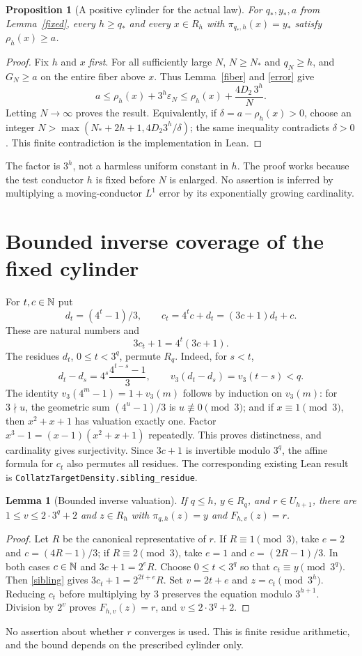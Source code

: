 \documentclass[11pt,a4paper]{article}
\newtheorem{lemma}[theorem]{Lemma}
\newtheorem{proposition}[theorem]{Proposition}
\theoremstyle{definition}\newtheorem{definition}[theorem]{Definition}
\theoremstyle{remark}\newtheorem{remark}[theorem]{Remark}
\newcommand{\proj}[2]{\pi_{#1,#2}}
\newcommand{\code}[1]{{\small\nolinkurl{#1}}}
\begin{document}
\begin{proposition}[A positive cylinder for the actual law]\label{actual}
For $q_*,y_*,a$ from Lemma~\ref{fixed}, every $h\ge q_*$ and every
$x\in R_h$ with $\proj{q_*}h(x)=y_*$ satisfy $\rho_h(x)\ge a$.
\end{proposition}
\begin{proof}
Fix $h$ and $x$ \emph{first}. For all sufficiently large $N$, $N\ge N_*$
and $q_N\ge h$, and $G_N\ge a$ on the entire fiber above $x$. Thus
Lemma~\ref{fiber} and \eqref{error} give
\[
 a\le\rho_h(x)+3^h\varepsilon_N\le\rho_h(x)+\frac{4D_2\,3^h}{N}.
\]
Letting $N\to\infty$ proves the result. Equivalently, if
$\delta=a-\rho_h(x)>0$, choose an integer
$N>\max(N_*+2h+1,4D_2 3^h/\delta)$; the same inequality contradicts
$\delta>0$. This finite contradiction is the implementation in Lean.
\end{proof}
The factor is $3^h$, not a harmless uniform constant in $h$. The proof
works because the test conductor $h$ is fixed before $N$ is enlarged.
No assertion is inferred by multiplying a moving-conductor $L^1$ error
by its exponentially growing cardinality.

\section{Bounded inverse coverage of the fixed cylinder}
For $t,c\in\mathbb N$ put
\[
 d_t=(4^t-1)/3,\qquad c_t=4^tc+d_t=(3c+1)d_t+c.
\]
These are natural numbers and
\begin{equation}\label{sibling}
 3c_t+1=4^t(3c+1).
\end{equation}
The residues $d_t$, $0\le t<3^q$, permute $R_q$. Indeed, for $s<t$,
\[
 d_t-d_s=4^s\frac{4^{t-s}-1}{3},\qquad
 v_3(d_t-d_s)=v_3(t-s)<q.
\]
The identity $v_3(4^m-1)=1+v_3(m)$ follows by induction on $v_3(m)$:
for $3\nmid u$, the geometric sum $(4^u-1)/3$ is $u\not\equiv0\pmod3$;
and if $x\equiv1\pmod3$, then $x^2+x+1$ has valuation exactly one.
Factor $x^3-1=(x-1)(x^2+x+1)$ repeatedly. This proves distinctness,
and cardinality gives surjectivity. Since $3c+1$ is invertible modulo
$3^q$, the affine formula for $c_t$ also permutes all residues.
The corresponding existing Lean result is \code{CollatzTargetDensity.sibling_residue}.

\begin{lemma}[Bounded inverse valuation]\label{inverse}
If $q\le h$, $y\in R_q$, and $r\in U_{h+1}$, there are
$1\le v\le2\cdot3^q+2$ and $z\in R_h$ with
$\proj qh(z)=y$ and $F_{h,v}(z)=r$.
\end{lemma}
\begin{proof}
Let $R$ be the canonical representative of $r$. If $R\equiv1\pmod3$,
take $e=2$ and $c=(4R-1)/3$; if $R\equiv2\pmod3$, take $e=1$ and
$c=(2R-1)/3$. In both cases $c\in\mathbb N$ and $3c+1=2^eR$.
Choose $0\le t<3^q$ so that $c_t\equiv y\pmod{3^q}$.
Then \eqref{sibling} gives $3c_t+1=2^{2t+e}R$. Set $v=2t+e$ and
$z=c_t\pmod{3^h}$. Reducing $c_t$ before multiplying by $3$ preserves
the equation modulo $3^{h+1}$. Division by $2^v$ proves
$F_{h,v}(z)=r$, and $v\le2\cdot3^q+2$.
\end{proof}
No assertion about whether $r$ converges is used. This is finite residue
arithmetic, and the bound depends on the prescribed cylinder only.
\end{document}

